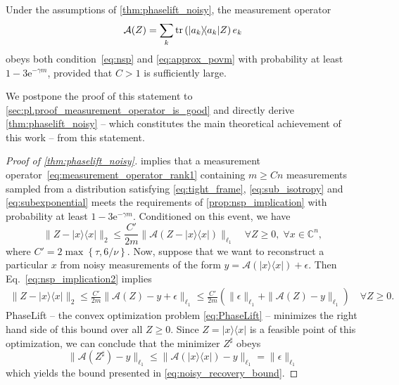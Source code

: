 \begin{proposition} \label{prop:RECR_nsp}
  Under the assumptions of \cref{thm:phaselift_noisy}, the measurement operator
  \begin{equation}
    \label{eq:measurement_operator_rank1}
    \mathcal{A}( Z) = \sum_k \tr \left(\ket{ a_k}\bra{ a_k}  Z\right)  e_k
  \end{equation}
  obeys both condition~\eqref{eq:nsp} and \eqref{eq:approx_povm} with probability at least $1- 3\mathrm{e}^{-\gamma m}$, provided that $C >1$ is sufficiently large.
\end{proposition}

We postpone the proof of this statement to \cref{sec:pl.proof_measurement_operator_is_good} and directly derive \cref{thm:phaselift_noisy} -- which constitutes the main theoretical achievement of this work -- from this statement.

\begin{proof}[Proof of \cref{thm:phaselift_noisy}]
 implies that a measurement operator~\eqref{eq:measurement_operator_rank1} containing $m \geq C n$ measurements sampled from a distribution satisfying \eqref{eq:tight_frame}, \eqref{eq:sub_isotropy} and \eqref{eq:subexponential} meets the requirements of \cref{prop:nsp_implication} with probability at least $1-3 \mathrm{e}^{-\gamma m}$.
Conditioned on this event, we have
\begin{equation}
\|  Z - |{x} \rangle \! \langle {x}| \|_2 \leq \frac{C'}{2m}  \| \mathcal{A}( Z - |{x} \rangle \! \langle {x}|) \|_{\ell_1} \quad \forall  Z \geq 0,\; \forall {x} \in \mathbb{C}^n,
\label{eq:nsp_implication2}
\end{equation}
where $C' = 2 \max \left\{\tau, 6/\nu \right\}$.
Now, suppose that we want to reconstruct a particular ${x}$ from noisy measurements of the form ${y} = \mathcal{A} (|{x} \rangle \! \langle {x}|) + {\epsilon}$. Then Eq.~\eqref{eq:nsp_implication2} implies
\begin{align*}
\|  Z - |{x} \rangle \! \langle {x}| \|_2 \leq \frac{C'}{2m} \| \mathcal{A}( Z) - {y} + {\epsilon} \|_{\ell_1}
\leq \frac{C'}{2m} \left( \| {\epsilon} \|_{\ell_1} + \| \mathcal{A}( Z) - {y} \|_{\ell_1} \right)\quad \forall  Z \geq 0.
\end{align*}
PhaseLift -- the convex optimization problem \eqref{eq:PhaseLift} -- minimizes the right hand side of this bound over all $ Z \geq 0$. Since $ Z = |{x} \rangle \! \langle {x}|$ is a feasible point of this optimization, we can conclude that the minimizer $ Z^\sharp$ obeys
\begin{equation*}
\| \mathcal{A}( Z^\sharp) - {y} \|_{\ell_1} \leq \| \mathcal{A}(|{x} \rangle \! \langle {x}|)-{y} \|_{\ell_1} = \| {\epsilon} \|_{\ell_1}
\end{equation*}
which yields the bound presented in \eqref{eq:noisy_recovery_bound}.
\end{proof}


